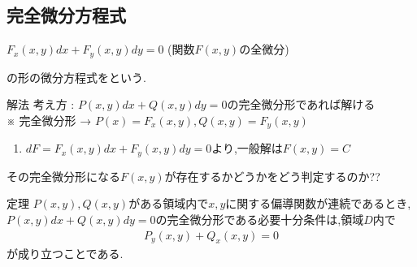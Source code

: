 \documentclass[a4paper]{jsarticle}
\begin{document}
\subsection{完全微分方程式}
\begin{center}
    $F_x\left(x,y\right)dx+F_y\left(x,y\right)dy=0$ (関数$F\left(x,y\right)$の全微分)
\end{center}
の形の微分方程式をという.
\begin{itembox}[l]{解法}
    考え方 : $P\left(x,y\right)dx+Q\left(x,y\right)dy=0$の完全微分形であれば解ける\\
    ※ 完全微分形 → $P\left(x\right)=F_x\left(x,y\right),Q\left(x,y\right)=F_y\left(x,y\right)$
    \begin{enumerate}[(1)]
        \item  $dF=F_x\left(x,y\right)dx+F_y\left(x,y\right)dy=0$より,一般解は$F\left(x,y\right)=C$
    \end{enumerate}
\end{itembox}
その完全微分形になる$F\left(x,y\right)$が存在するかどうかをどう判定するのか??
\begin{itembox}[l]{定理}
    $P\left(x,y\right),Q\left(x,y\right)$がある領域内で$x,y$に関する偏導関数が連続であるとき,\\
    $P\left(x,y\right)dx+Q\left(x,y\right)dy=0$の完全微分形である必要十分条件は,領域$D$内で
    \begin{eqnarray*}
        P_y\left(x,y\right)+Q_x\left(x,y\right)=0
    \end{eqnarray*}
    が成り立つことである.
\end{itembox}
\end{document}
